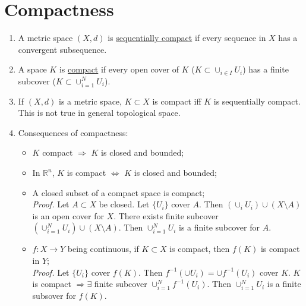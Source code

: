 \documentclass[%
 aip,
 jmp,%
 amsmath,amssymb,
 reprint,%
]{revtex4-1}
\def\R{{\mathbb R}}
\def\Ra{\Rightarrow}
\renewenvironment{proof}{\color{gray}\footnotesize\emph{Proof.}}{}
\newcommand{\defn}[1]{\underline{#1}}
\begin{document}
\section{Compactness}
\begin{enumerate}
    \item A metric space $(X,d)$ is \defn{sequentially compact} if every sequence
    in $X$ has a convergent subsequence.

    \item A space $K$ is \defn{compact} if every open cover of $K$
    ($K \subset \cup_{i\in I} U_i$) has a finite subcover ($K \subset \cup_{i=1}^{N} U_i$).
    \item If $(X,d)$ is a metric space, $K \subset X$ is compact iff $K$ is
    sequentially compact.
    {\footnotesize\color{gray} This is not true in general topological space.}

    \item Consequences of compactness:
        \begin{itemize}
            \item $K$ compact $\Ra$ $K$ is closed and bounded;
            \item In $\R^n$, $K$ is compact $\Leftrightarrow$ $K$ is closed and bounded;
            \item A closed subset of a compact space is compact; \\
                \begin{proof}
                    Let $A \subset X$ be closed. Let $\{U_i\}$ cover $A$.
                    Then $(\cup_i U_i) \cup (X\setminus A) $ is an open cover for $X$.
                    There exists finite subcover $(\cup_{i=1}^N U_i) \cup (X\setminus A)$.
                    Then $\cup_{i=1}^N U_i$ is a finite subcover for $A$.
                \end{proof}

            \item $f:X \to Y$ being continuous, if $K\subset X$ is compact,
                  then $f(K)$ is compact in $Y$; \\
                \begin{proof}
                    Let $\{U_i\}$ cover $f(K)$. Then $f^{-1}(\cup U_i)=\cup f^{-1}(U_i)$
                    cover $K$. $K$ is compact $\Ra\exists$ finite subcover
                    $\cup_{i=1}^N f^{-1}(U_i)$.
                    Then $\cup_{i=1}^N U_i$ is a finite subsover for $f(K)$.
                \end{proof}


\end{itemize}
\end{enumerate}
\end{document}
